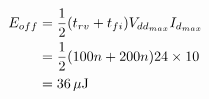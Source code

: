 \subsection{}

\begin{align*}
E_{off} & = \frac{1}{2} (t_{rv} + t_{fi}) V_{dd_{max} } I_{d_{max}} \\
        & = \frac{1}{2} (100n + 200n) 24 \times 10 \\
        & = \unit[36]{\mu{}J}
\end{align*}